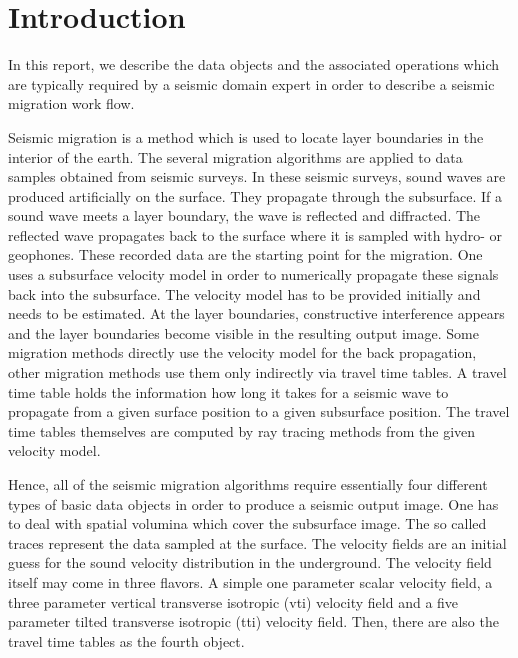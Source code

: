 \documentclass[12pt,a4paper]{article}
\begin{document}

\newpage

\tableofcontents

\newpage

\section{Introduction}

In this report, we describe the data objects and the associated 
operations which are typically required by a seismic domain expert 
in order to describe a seismic migration work flow. 

Seismic migration is a method which is used to locate layer 
boundaries in the interior of the earth. The several migration
algorithms are applied to data samples obtained from seismic surveys. 
In these seismic surveys, sound waves are produced artificially on the 
surface. They propagate through the subsurface. If a sound wave meets a layer 
boundary, the wave is reflected and diffracted. The reflected wave propagates back to the 
surface where it is sampled with hydro- or geophones. These recorded data are the starting point
for the migration. One uses a subsurface velocity model in order to numerically propagate these 
signals back into the subsurface. The velocity model has to be provided initially and needs to be
estimated. 
At the layer boundaries, constructive interference appears and the layer boundaries become visible 
in the resulting output image. Some migration methods directly use the velocity model for the back propagation, other migration methods use them only indirectly via travel time tables. A travel time table 
holds the information how long it takes for a seismic wave to propagate from a given surface position to a given subsurface position. The travel time tables themselves are computed by ray tracing methods from the given velocity model.  

Hence, all of the seismic migration algorithms require essentially four different types of 
basic data objects in order to produce a seismic output image. One has to 
deal with spatial volumina which cover the subsurface image. The 
so called traces represent the data sampled at the surface.  
The velocity fields are an initial guess for the sound velocity 
distribution in the underground. The velocity field itself may come in three flavors. A simple one parameter scalar velocity field, a three parameter vertical transverse
isotropic (vti) velocity field and a five parameter tilted transverse isotropic (tti) velocity field. 
Then, there are also the travel time tables as the fourth object.
\end{document}
